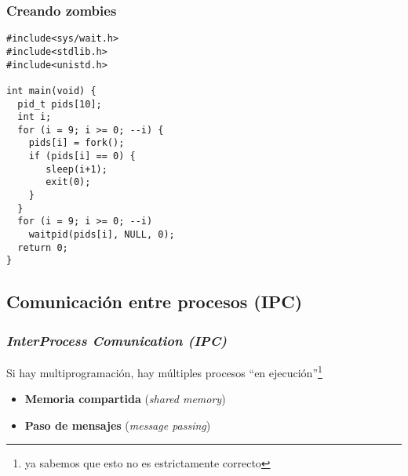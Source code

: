 \documentclass[letter]{beamer}
\begin{document}
\begin{frame}[fragile]
  \frametitle{Creando zombies}

\begin{verbatim}
#include<sys/wait.h>
#include<stdlib.h>
#include<unistd.h>

int main(void) {
  pid_t pids[10];
  int i;
  for (i = 9; i >= 0; --i) {
    pids[i] = fork();
    if (pids[i] == 0) {
       sleep(i+1);
       exit(0);
    }
  }
  for (i = 9; i >= 0; --i)
    waitpid(pids[i], NULL, 0);
  return 0;
}
\end{verbatim}
\end{frame}

\subsection{Comunicación entre procesos (IPC)}

\begin{frame}
  \frametitle{{\em InterProcess Comunication (IPC)}}

  Si hay multiprogramación, hay múltiples procesos ``en ejecución''\footnote{ya sabemos que esto no es estrictamente correcto}

  
  \begin{itemize}
    \item<5-> {\bf Memoria compartida} ({\em shared memory})
    \item<5-> {\bf Paso de mensajes} ({\em message passing})
  \end{itemize}
  
\end{frame}
\end{document}

